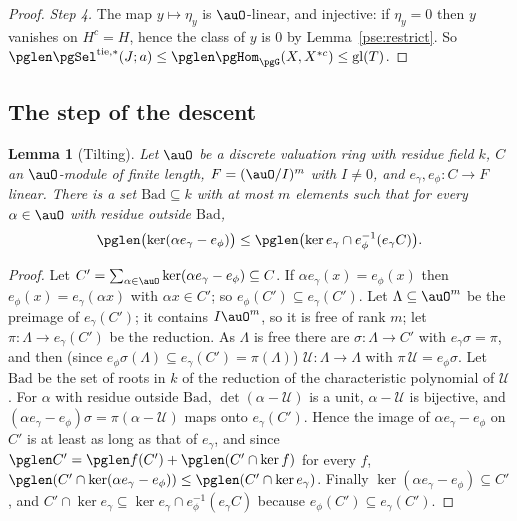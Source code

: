 \documentclass[10pt]{amsart}
\newtheorem{lemma}[theorem]{Lemma}
\theoremstyle{definition}
\theoremstyle{remark}
\begin{document}
\begin{proof}
\emph{Step 4.} The map $y\mapsto\eta_y$ is $\auO$-linear, and injective: if $\eta_y=0$ then $y$
vanishes on $H^c=H$, hence the class of $y$ is $0$ by Lemma~\ref{pse:restrict}. So
$\pglen\pgSel^{\mathrm{tie},*}(J;a)\le\pglen\pgHom_{\pgG}(X,X^{*c})\le\mathrm{gl}(T)$.
\end{proof}

\subsection{The step of the descent}\label{pse:ss-step}

\begin{lemma}[Tilting]\label{pse:tilting}
Let $\auO$ be a discrete valuation ring with residue field $k$, $C$ an $\auO$-module of finite
length, $F=(\auO/I)^m$ with $I\ne0$, and $e_\gamma,e_\phi\colon C\to F$ linear. There is a set
$\mathrm{Bad}\subseteq k$ with at most $m$ elements such that for every $\alpha\in\auO$ with residue
outside $\mathrm{Bad}$,
\[
\pglen\bigl(\ker(\alpha e_\gamma-e_\phi)\bigr)\le\pglen\bigl(\ker e_\gamma\cap e_\phi^{-1}(e_\gamma
C)\bigr).
\]
\end{lemma}
\begin{proof}
Let $C'=\sum_{\alpha\in\auO}\ker(\alpha e_\gamma-e_\phi)\subseteq C$. If $\alpha e_\gamma(x)=
e_\phi(x)$ then $e_\phi(x)=e_\gamma(\alpha x)$ with $\alpha x\in C'$; so $e_\phi(C')\subseteq
e_\gamma(C')$. Let $\Lambda\subseteq\auO^m$ be the preimage of $e_\gamma(C')$; it contains $I\auO^m$,
so it is free of rank $m$; let $\pi\colon\Lambda\to e_\gamma(C')$ be the reduction. As $\Lambda$ is
free there are $\sigma\colon\Lambda\to C'$ with $e_\gamma\sigma=\pi$, and then (since
$e_\phi\sigma(\Lambda)\subseteq e_\gamma(C')=\pi(\Lambda)$) $\mathcal U\colon\Lambda\to\Lambda$ with
$\pi\,\mathcal U=e_\phi\sigma$. Let $\mathrm{Bad}$ be the set of roots in $k$ of the reduction of the
characteristic polynomial of $\mathcal U$. For $\alpha$ with residue outside $\mathrm{Bad}$,
$\det(\alpha-\mathcal U)$ is a unit, $\alpha-\mathcal U$ is bijective, and $(\alpha e_\gamma-e_\phi)
\sigma=\pi(\alpha-\mathcal U)$ maps onto $e_\gamma(C')$. Hence the image of $\alpha e_\gamma-e_\phi$
on $C'$ is at least as long as that of $e_\gamma$, and since
$\pglen C'=\pglen f(C')+\pglen(C'\cap\ker f)$ for every $f$, $\pglen(C'\cap\ker(\alpha e_\gamma-
e_\phi))\le\pglen(C'\cap\ker e_\gamma)$. Finally $\ker(\alpha e_\gamma-e_\phi)\subseteq C'$, and
$C'\cap\ker e_\gamma\subseteq\ker e_\gamma\cap e_\phi^{-1}(e_\gamma C)$ because $e_\phi(C')\subseteq
e_\gamma(C')$.
\end{proof}
\end{document}
